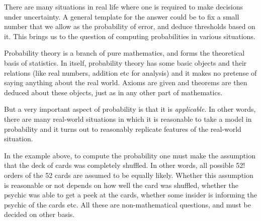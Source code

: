 \documentclass[preprint,  11pt]{amsart}
\theoremstyle{plain} %
\theoremstyle{definition} %
\begin{document}
 There are many situations in real life where one is required to make decisions under uncertainty. A general template for the answer could be to fix a small number that we allow as the probability of error, and deduce thresholds based on it. This brings us to the question of computing probabilities in various situations.



\vspace{4mm}
 Probability theory is a branch of pure mathematics, and forms the theoretical basis of statistics. In itself, probability theory has some basic objects and their relations (like real numbers, addition etc for analysis) and it makes no pretense of saying anything about the real world. Axioms are given and theorems are then deduced about these objects, just as in any other part of mathematics. 

But a very important aspect of probability is that it is {\em applicable}. In other words, there are many real-world situations in which it is reasonable to take a model in probability and it turns out to reasonably replicate features of  the real-world situation.

In the example above, to compute the probability one must make the assumption that the deck of cards was completely shuffled. In other words, all possible 52! orders of the 52 cards are assumed to be equally likely. Whether this assumption is reasonable or not depends on how well the card was shuffled, whether the psychic was able to get a peek at the cards, whether some insider is informing the psychic of the cards etc. All these are non-mathematical questions, and must be decided on other basis.
\end{document}
